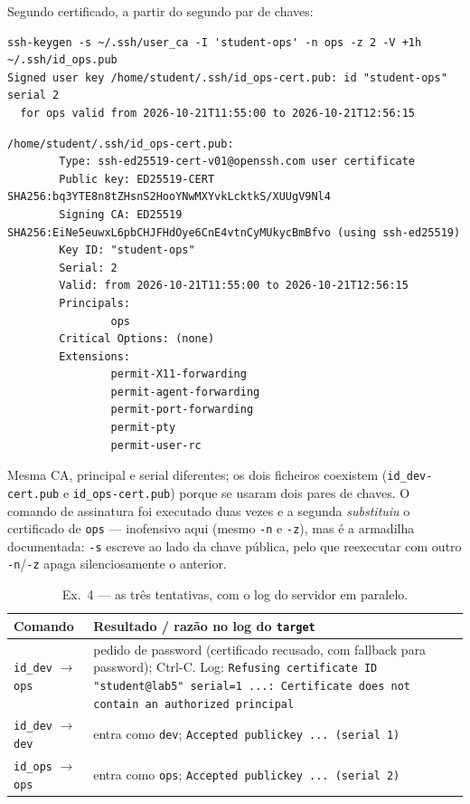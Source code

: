 \documentclass[a4paper,11pt]{article}
\newcommand{\cmd}[1]{\textcolor{sscnblue}{\texttt{#1}}}
\begin{document}
Segundo certificado, a partir do segundo par de chaves:

\begin{lstlisting}
ssh-keygen -s ~/.ssh/user_ca -I 'student-ops' -n ops -z 2 -V +1h ~/.ssh/id_ops.pub
Signed user key /home/student/.ssh/id_ops-cert.pub: id "student-ops" serial 2
  for ops valid from 2026-10-21T11:55:00 to 2026-10-21T12:56:15
\end{lstlisting}

\begin{lstlisting}
/home/student/.ssh/id_ops-cert.pub:
        Type: ssh-ed25519-cert-v01@openssh.com user certificate
        Public key: ED25519-CERT SHA256:bq3YTE8n8tZHsnS2HooYNwMXYvkLcktkS/XUUgV9Nl4
        Signing CA: ED25519 SHA256:EiNe5euwxL6pbCHJFHdOye6CnE4vtnCyMUkycBmBfvo (using ssh-ed25519)
        Key ID: "student-ops"
        Serial: 2
        Valid: from 2026-10-21T11:55:00 to 2026-10-21T12:56:15
        Principals:
                ops
        Critical Options: (none)
        Extensions:
                permit-X11-forwarding
                permit-agent-forwarding
                permit-port-forwarding
                permit-pty
                permit-user-rc
\end{lstlisting}

Mesma CA, principal e serial diferentes; os dois ficheiros coexistem
(\cmd{id\_dev-cert.pub} e \cmd{id\_ops-cert.pub}) porque se usaram dois pares de chaves.
O comando de assinatura foi executado duas vezes e a segunda \emph{substituiu} o
certificado de \cmd{ops} --- inofensivo aqui (mesmo \cmd{-n} e \cmd{-z}), mas \'e a
armadilha documentada: \cmd{-s} escreve ao lado da chave p\'ublica, pelo que reexecutar
com outro \cmd{-n}/\cmd{-z} apaga silenciosamente o anterior.

\begin{table}[H]
\centering\small
\caption{Ex.\ 4 --- as tr\^es tentativas, com o log do servidor em paralelo.}
\begin{tabularx}{\linewidth}{@{}l X@{}}
\toprule
\textbf{Comando} & \textbf{Resultado / raz\~ao no log do \cmd{target}} \\
\midrule
\cmd{id\_dev} $\rightarrow$ \cmd{ops} & pedido de password (certificado recusado, com
  fallback para password); Ctrl-C. Log: \cmd{Refusing certificate ID "student@lab5"
  serial=1 ...: Certificate does not contain an authorized principal} \\
\cmd{id\_dev} $\rightarrow$ \cmd{dev} & entra como \cmd{dev}; \cmd{Accepted publickey
  ... (serial 1)} \\
\cmd{id\_ops} $\rightarrow$ \cmd{ops} & entra como \cmd{ops}; \cmd{Accepted publickey
  ... (serial 2)} \\
\bottomrule
\end{tabularx}
\end{table}
\end{document}
